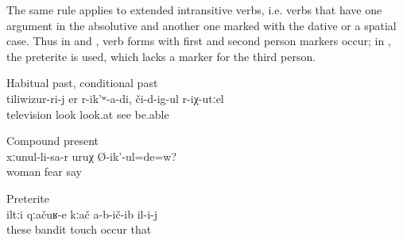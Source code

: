 The same rule applies to extended intransitive verbs, i.e. verbs that have one argument in the absolutive and another one marked with the dative or a spatial case. Thus in  and , verb forms with first and second person markers occur; in , the preterite is used, which lacks a marker for the third person.
%
\begin{exe}
		\ex	Habitual past, conditional past\\	\label{ex:‎I would watch TV if I were able to see habitual conditional past}
		\gll	tiliwizur-ri-j	er	r-ik'ʷ-a-di,	či-d-ig-ul	r-iχ-utːel\\
			television	look	look.at	see	be.able\\
		\glt	{}

		\ex	Compound present\\	\label{ex:Are you afraid of your wife compound present}
		\gll	xːunul-li-sa-r	uruχ	Ø-ik'-ul=de=w?\\
			woman	fear	say\\
		\glt	{}

		\ex	Preterite\\	\label{ex:‎‎‎The bandits did not touch him preterite}
		\gll	iltːi	qːačuʁ-e	kːač	a-b-ič-ib	il-i-j\\
			these	bandit	touch	occur	that\\
		\glt	{}
\end{exe}

